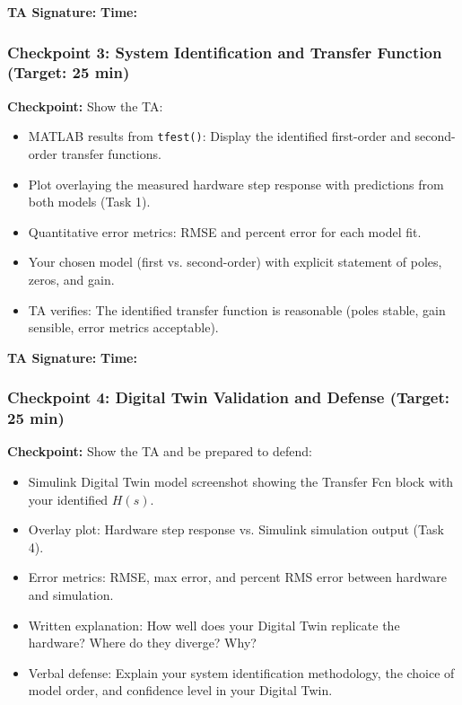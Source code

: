 \documentclass[11pt,letterpaper]{article}
\providecommand{\cpECE}[1]{\textcolor{OliveGreen}{\textbf{Checkpoint:} #1}}
\begin{document}
\vspace{0.3cm}
\textbf{TA Signature:} \underline{\hspace{2.5cm}} \quad \textbf{Time:} \underline{\hspace{1.5cm}}

\vspace{0.5cm}

\subsubsection*{Checkpoint 3: System Identification and Transfer Function (Target: 25 min)}

\cpECE{Show the TA:}
\begin{itemize}
    \item[$\square$] MATLAB results from \texttt{tfest()}: Display the identified first-order and second-order transfer functions.
    \item[$\square$] Plot overlaying the measured hardware step response with predictions from both models (Task 1).
    \item[$\square$] Quantitative error metrics: RMSE and percent error for each model fit.
    \item[$\square$] Your chosen model (first vs. second-order) with explicit statement of poles, zeros, and gain.
    \item[$\square$] TA verifies: The identified transfer function is reasonable (poles stable, gain sensible, error metrics acceptable).
\end{itemize}

\vspace{0.3cm}
\textbf{TA Signature:} \underline{\hspace{2.5cm}} \quad \textbf{Time:} \underline{\hspace{1.5cm}}

\vspace{0.5cm}

\subsubsection*{Checkpoint 4: Digital Twin Validation and Defense (Target: 25 min)}

\cpECE{Show the TA and be prepared to defend:}
\begin{itemize}
    \item[$\square$] Simulink Digital Twin model screenshot showing the Transfer Fcn block with your identified $H(s)$.
    \item[$\square$] Overlay plot: Hardware step response vs. Simulink simulation output (Task 4).
    \item[$\square$] Error metrics: RMSE, max error, and percent RMS error between hardware and simulation.
    \item[$\square$] Written explanation: How well does your Digital Twin replicate the hardware? Where do they diverge? Why?
    \item[$\square$] Verbal defense: Explain your system identification methodology, the choice of model order, and confidence level in your Digital Twin.
\end{itemize}
\end{document}
